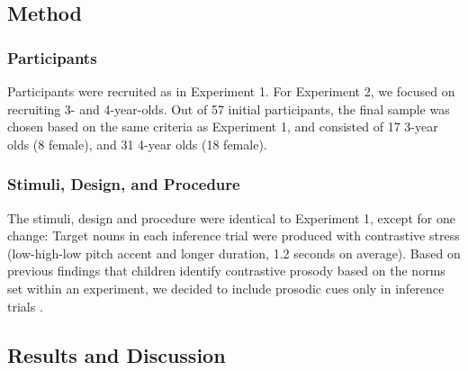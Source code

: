 \documentclass[10pt,letterpaper]{article}
\begin{document}
\subsection{Method}

\subsubsection{Participants}

Participants were recruited as in Experiment 1. For Experiment 2, we focused on recruiting 3- and 4-year-olds. Out of 57 initial participants, the final sample was chosen based on the same criteria as Experiment 1, and consisted of 17 3-year olds (8 female), and 31 4-year olds (18 female).


\subsubsection{Stimuli, Design, and Procedure}

The stimuli, design and procedure were identical to Experiment 1, except for one change: Target nouns in each inference trial were produced with contrastive stress (low-high-low pitch accent and longer duration, 1.2 seconds on average). Based on previous findings that children identify contrastive prosody based on the norms set within an experiment, we decided to include prosodic cues only in inference trials \cite{kurumada1contextual}. 

\subsection{Results and Discussion}
\end{document}
